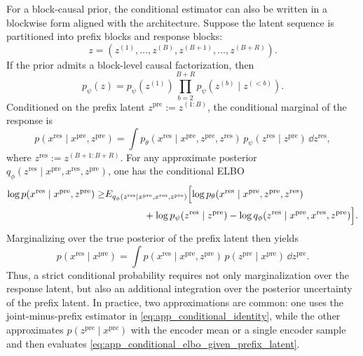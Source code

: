 For a block-causal prior, the conditional estimator can also be written in a blockwise form aligned with the architecture. Suppose the latent sequence is partitioned into prefix blocks and response blocks:
\begin{equation}
z=(z^{(1)},\dots,z^{(B)},z^{(B+1)},\dots,z^{(B+R)}).
\label{eq:app_block_partition}
\end{equation}
If the prior admits a block-level causal factorization, then
\begin{equation}
p_{\psi}(z)
=
p_{\psi}(z^{(1)})
\prod_{b=2}^{B+R}p_{\psi}(z^{(b)}\mid z^{(<b)}).
\label{eq:app_block_causal_prior}
\end{equation}
Conditioned on the prefix latent $z^{\mathrm{pre}}:=z^{(1:B)}$, the conditional marginal of the response is
\begin{equation}
p(x^{\mathrm{res}}\mid x^{\mathrm{pre}},z^{\mathrm{pre}})
=
\int p_{\theta}(x^{\mathrm{res}}\mid x^{\mathrm{pre}},z^{\mathrm{pre}},z^{\mathrm{res}})
\,p_{\psi}(z^{\mathrm{res}}\mid z^{\mathrm{pre}})
\,\dd z^{\mathrm{res}},
\label{eq:app_conditional_marginal_given_prefix_latent}
\end{equation}
where $z^{\mathrm{res}}:=z^{(B+1:B+R)}$. For any approximate posterior $q_{\phi}(z^{\mathrm{res}}\mid x^{\mathrm{pre}},x^{\mathrm{res}},z^{\mathrm{pre}})$, one has the conditional ELBO
\begin{align}
\log p(x^{\mathrm{res}}\mid x^{\mathrm{pre}},z^{\mathrm{pre}})
\ge
&E_{q_{\phi}(z^{\mathrm{res}}\mid x^{\mathrm{pre}},x^{\mathrm{res}},z^{\mathrm{pre}})}\Bigl[
\log p_{\theta}(x^{\mathrm{res}}\mid x^{\mathrm{pre}},z^{\mathrm{pre}},z^{\mathrm{res}}) \\
&\qquad\qquad +\log p_{\psi}(z^{\mathrm{res}}\mid z^{\mathrm{pre}})
-\log q_{\phi}(z^{\mathrm{res}}\mid x^{\mathrm{pre}},x^{\mathrm{res}},z^{\mathrm{pre}})
\Bigr].
\label{eq:app_conditional_elbo_given_prefix_latent}
\end{align}
Marginalizing over the true posterior of the prefix latent then yields
\begin{equation}
p(x^{\mathrm{res}}\mid x^{\mathrm{pre}})
=
\int p(x^{\mathrm{res}}\mid x^{\mathrm{pre}},z^{\mathrm{pre}})
\,p(z^{\mathrm{pre}}\mid x^{\mathrm{pre}})\,\dd z^{\mathrm{pre}}.
\label{eq:app_conditional_with_prefix_posterior}
\end{equation}
Thus, a strict conditional probability requires not only marginalization over the response latent, but also an additional integration over the posterior uncertainty of the prefix latent. In practice, two approximations are common: one uses the joint-minus-prefix estimator in \eqref{eq:app_conditional_identity}, while the other approximates $p(z^{\mathrm{pre}}\mid x^{\mathrm{pre}})$ with the encoder mean or a single encoder sample and then evaluates \eqref{eq:app_conditional_elbo_given_prefix_latent}.

